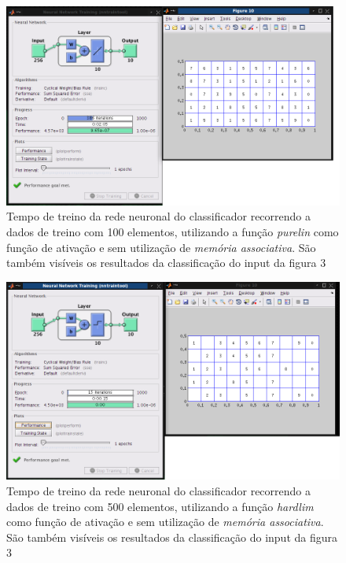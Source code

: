 \documentclass{article}
\begin{document}
\begin{figure}[h]
  \centering
      \includegraphics[scale=0.3]{100_Linear.png}
  \caption{Tempo de treino da rede neuronal do classificador recorrendo a dados de treino com 100 elementos, utilizando a função \emph{purelin} como função de ativação e sem utilização de \emph{memória associativa}. São também visíveis os resultados da classificação do input da figura 3}
\end{figure}

\begin{figure}[h]
  \centering
      \includegraphics[scale=0.3]{500_Hardlim.png}
  \caption{Tempo de treino da rede neuronal do classificador recorrendo a dados de treino com 500 elementos, utilizando a função \emph{hardlim} como função de ativação e sem utilização de \emph{memória associativa}. São também visíveis os resultados da classificação do input da figura 3}
\end{figure}
\end{document}
